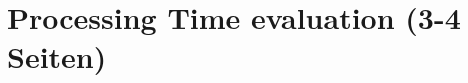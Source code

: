 \documentclass[ExampleMasters.tex]{subfiles}
\begin{document}
\clearpage
\chapter{Processing Time evaluation (3-4 Seiten)}
\end{document}
